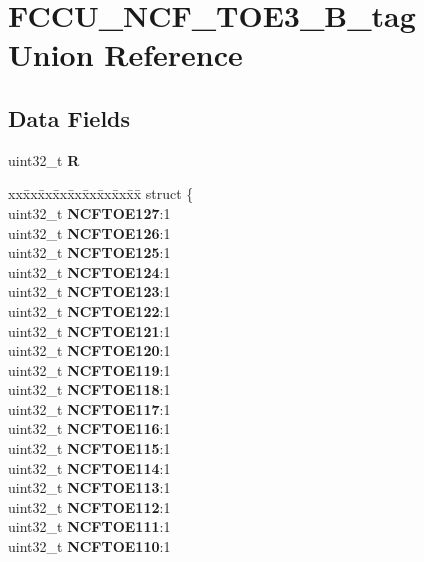 \hypertarget{unionFCCU__NCF__TOE3__32B__tag}{}\section{F\+C\+C\+U\+\_\+\+N\+C\+F\+\_\+\+T\+O\+E3\+\_\+B\+\_\+tag Union Reference}
\label{unionFCCU__NCF__TOE3__32B__tag}
\subsection*{Data Fields}
\begin{DoxyCompactItemize}
\item 
\mbox{\label{unionFCCU__NCF__TOE3__32B__tag_a6376daebf142a8db866cac0a63a3790a}} 
uint32\+\_\+t {\bfseries R}
\item 
\mbox{\label{unionFCCU__NCF__TOE3__32B__tag_af77cff67fe8e0b608dc16cdc1d15fc0e}} 
\begin{tabbing}
xx\=xx\=xx\=xx\=xx\=xx\=xx\=xx\=xx\=\kill
struct \{\\
\>uint32\_t {\bfseries NCFTOE127}:1\\
\>uint32\_t {\bfseries NCFTOE126}:1\\
\>uint32\_t {\bfseries NCFTOE125}:1\\
\>uint32\_t {\bfseries NCFTOE124}:1\\
\>uint32\_t {\bfseries NCFTOE123}:1\\
\>uint32\_t {\bfseries NCFTOE122}:1\\
\>uint32\_t {\bfseries NCFTOE121}:1\\
\>uint32\_t {\bfseries NCFTOE120}:1\\
\>uint32\_t {\bfseries NCFTOE119}:1\\
\>uint32\_t {\bfseries NCFTOE118}:1\\
\>uint32\_t {\bfseries NCFTOE117}:1\\
\>uint32\_t {\bfseries NCFTOE116}:1\\
\>uint32\_t {\bfseries NCFTOE115}:1\\
\>uint32\_t {\bfseries NCFTOE114}:1\\
\>uint32\_t {\bfseries NCFTOE113}:1\\
\>uint32\_t {\bfseries NCFTOE112}:1\\
\>uint32\_t {\bfseries NCFTOE111}:1\\
\>uint32\_t {\bfseries NCFTOE110}:1\\

\end{tabbing}
\end{DoxyCompactItemize}

